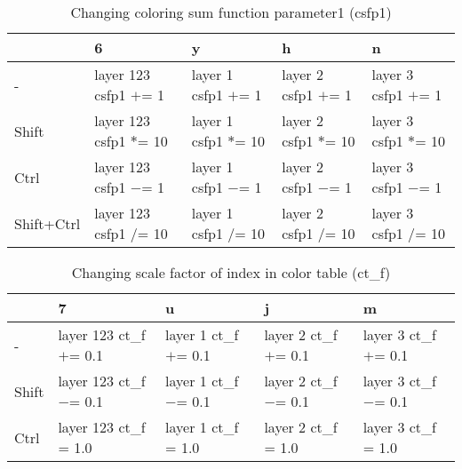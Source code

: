 \documentclass[10pt,a4paper]{article}
\begin{document}
\begin{table}[h!]
    \caption{Changing coloring sum function parameter1 (csfp1)}
    \setlength{\tabcolsep}{0.0pt}
    \begin{tabularx}{\linewidth}{LLLLL}
        \toprule
                   & 6                       & y                     & h                     & n                     \\
        \midrule
        -          & layer 123 csfp1 $+$= 1  & layer 1 csfp1 $+$= 1  & layer 2 csfp1 $+$= 1  & layer 3 csfp1 $+$= 1  \\
        Shift      & layer 123 csfp1 $*$= 10 & layer 1 csfp1 $*$= 10 & layer 2 csfp1 $*$= 10 & layer 3 csfp1 $*$= 10 \\
        Ctrl       & layer 123 csfp1 $-$= 1  & layer 1 csfp1 $-$= 1  & layer 2 csfp1 $-$= 1  & layer 3 csfp1 $-$= 1  \\
        Shift+Ctrl & layer 123 csfp1 $/$= 10 & layer 1 csfp1 $/$= 10 & layer 2 csfp1 $/$= 10 & layer 3 csfp1 $/$= 10 \\
        \bottomrule
    \end{tabularx}
\end{table}

\begin{table}[h!]
    \caption{Changing scale factor of index in color table (ct\_f)}
    \setlength{\tabcolsep}{0.0pt}
    \begin{tabularx}{\linewidth}{LLLLL}
        \toprule
                   & 7                        &  u                     & j                      & m                      \\
        \midrule
        -          & layer 123 ct\_f $+$= 0.1 & layer 1 ct\_f $+$= 0.1 & layer 2 ct\_f $+$= 0.1 & layer 3 ct\_f $+$= 0.1 \\
        Shift      & layer 123 ct\_f $-$= 0.1 & layer 1 ct\_f $-$= 0.1 & layer 2 ct\_f $-$= 0.1 & layer 3 ct\_f $-$= 0.1 \\
        Ctrl       & layer 123 ct\_f = 1.0    & layer 1 ct\_f = 1.0    & layer 2 ct\_f = 1.0    & layer 3 ct\_f = 1.0    \\
        \bottomrule
    \end{tabularx}
\end{table}
\end{document}
